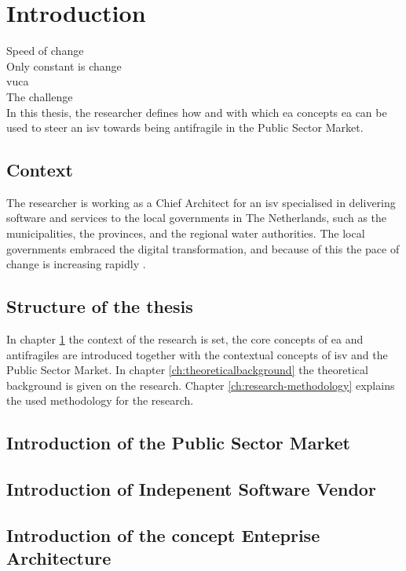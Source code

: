 \chapter{Introduction}
\label{ch:introduction}
Speed of change\\
Only constant is change\\

\acrfull{vuca}\\
The challenge\\

In this thesis, the researcher defines how and with which \acrfull{ea} concepts \acrshort{ea} can be used to steer an \acrfull{isv} towards being \gls{antifragile} in the Public Sector Market.

\section{Context}
\label{sec:context}
The researcher is working as a Chief Architect for an \acrshort{isv} specialised in delivering software and services to the local governments in The Netherlands, such as the municipalities, the provinces, and the regional water authorities. The local governments embraced the digital transformation, and because of this the pace of change is increasing rapidly \needsref. 

\section{Structure of the thesis}
\label{sec:structure}
In chapter \ref{ch:introduction} the context of the research is set, the core concepts of \acrshort{ea} and \glspl{antifragile} are introduced together with the contextual concepts of \acrshort{isv} and the Public Sector Market. In chapter \ref{ch:theoreticalbackground} the theoretical background is given on the research. Chapter \ref{ch:research-methodology} explains the used methodology for the research.

\section{Introduction of the Public Sector Market}
\label{sec:intropublicsector}

\section{Introduction of Indepenent Software Vendor}
\label{sec:introisv}

\section{Introduction of the concept Enteprise Architecture}
\label{introea}

